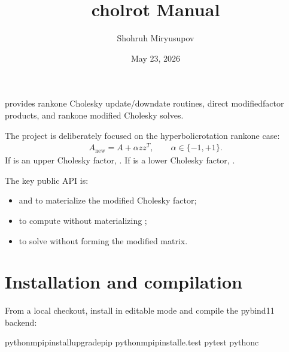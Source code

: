 \documentclass[a4paper,11pt,english]{sphinxmanual}
\title{cholrot Manual}
\date{May 23, 2026}
\author{Shohruh Miryusupov}
\begin{document}
\pagestyle{empty}
\sphinxmaketitle
\pagestyle{plain}
\sphinxtableofcontents
\pagestyle{normal}
\label{\detokenize{index::doc}}


\sphinxAtStartPar
{} provides rank\sphinxhyphen{}one Cholesky update/downdate routines, direct
modified\sphinxhyphen{}factor products, and rank\sphinxhyphen{}one modified Cholesky solves.

\sphinxAtStartPar
The project is deliberately focused on the hyperbolic\sphinxhyphen{}rotation rank\sphinxhyphen{}one case:
\begin{equation*}
\begin{split}A_{\mathrm{new}} = A + \alpha z z^T, \qquad \alpha \in \{-1, +1\}.\end{split}
\end{equation*}
\sphinxAtStartPar
If  is an upper Cholesky factor, .  If  is a lower
Cholesky factor, .

\sphinxAtStartPar
The key public API is:
\begin{itemize}
\item {} 
\sphinxAtStartPar
{} and  to materialize the modified Cholesky factor;

\item {} 
\sphinxAtStartPar
{} to compute  without materializing ;

\item {} 
\sphinxAtStartPar
{} to solve  without forming the
modified matrix.

\end{itemize}

\sphinxstepscope


\chapter{Installation and compilation}
\label{\detokenize{installation:installation-and-compilation}}\label{\detokenize{installation::doc}}
\sphinxAtStartPar
From a local checkout, install in editable mode and compile the pybind11 backend:

\begin{sphinxVerbatim}[commandchars=\\\{\}]
python\PYGZhy{}mpipinstall\PYGZhy{}\PYGZhy{}upgradepip
python\PYGZhy{}mpipinstall\PYGZhy{}e.\PYG{o}{[}test\PYG{o}{]}
pytest
python\PYGZhy{}c
\end{sphinxVerbatim}
\end{document}
